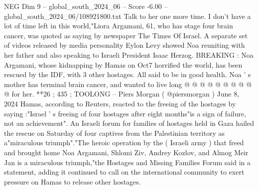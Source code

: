 \begin{textsample}{NEG Dim 9 – global\_south\_2024\_06 – Score -6.00 – global\_south\_2024\_06/108921800.txt}
Talk to her one more time.
I don't have a lot of time left in this world,"Liora Argamani, 61, who has stage four brain cancer, was quoted as saying by newspaper The Times Of Israel.
A separate set of videos released by media personality Eylon Levy showed Noa reuniting with her father and also speaking to Israeli President Isaac Herzog.
BREAKING : Noa Argamani, whose kidnapping by Hamas on Oct7 horrified the world, has been rescued by the IDF, with 3 other hostages.
All said to be in good health.
Noa ' s mother has terminal brain cancer, and wanted to live long @ @ @ @ @ @ @ @ @ @ for her. **26 ; 435 ; TOOLONG -- Piers Morgan ( @piersmorgan ) June 8, 2024 Hamas, according to Reuters, reacted to the freeing of the hostages by saying :"Israel ' s freeing of four hostages after eight months"is a sign of failure, not an achievement".
An Israeli forum for families of hostages held in Gaza hailed the rescue on Saturday of four captives from the Palestinian territory as a"miraculous triumph"."The heroic operation by the ( Israeli army ) that freed and brought home Noa Argamani, Shlomi Ziv, Andrey Kozlov, and Almog Meir Jan is a miraculous triumph,"the Hostages and Missing Families Forum said in a statement, adding it continued to call on the international community to exert pressure on Hamas to release other hostages.

\end{textsample}
